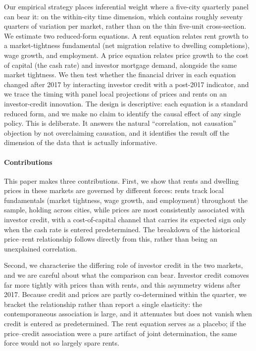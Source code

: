 \documentclass[preprint,11pt,authoryear]{elsarticle}
\begin{document}
Our empirical strategy places inferential weight where a five-city
quarterly panel can bear it: on the within-city time dimension, which
contains roughly seventy quarters of variation per market, rather than
on the thin five-unit cross-section. We estimate two reduced-form
equations. A rent equation relates rent growth to a market-tightness
fundamental (net migration relative to dwelling completions), wage
growth, and employment. A price equation relates price growth to the
cost of capital (the cash rate) and investor mortgage demand, alongside
the same market tightness. We then test whether the financial driver in
each equation changed after 2017 by interacting investor credit with a
post-2017 indicator, and we trace the timing with panel local
projections of prices and rents on an investor-credit innovation. The design is descriptive: each equation is a standard
reduced form, and we make no claim to identify the causal effect of any
single policy. This is deliberate. It answers the natural ``correlation,
not causation'' objection by not overclaiming causation, and it
identifies the result off the dimension of the data that is actually
informative.

\paragraph{\bf Contributions}
This paper makes three contributions. First, we show that rents and
dwelling prices in these markets are governed by different forces:
rents track local fundamentals (market tightness, wage growth, and
employment) throughout the sample, holding across cities, while prices are
most consistently associated with investor credit, with a cost-of-capital
channel that carries its expected sign only when the cash rate is entered
predetermined. The breakdown of the
historical price--rent relationship follows directly from this, rather
than being an unexplained correlation.

Second, we characterise the differing role of investor credit in the
two markets, and we are careful about what the comparison can bear.
Investor credit comoves far more tightly with prices than with rents,
and this asymmetry widens after 2017. Because credit and prices are
partly co-determined within the quarter, we bracket the relationship
rather than report a single elasticity: the contemporaneous association
is large, and it attenuates but does not vanish when credit is entered
as predetermined. The rent equation serves as a placebo; if the
price--credit association were a pure artifact of joint determination,
the same force would not so largely spare rents.
\end{document}
